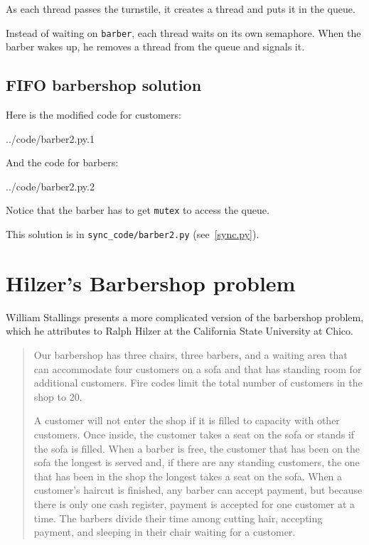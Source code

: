 \documentclass{book}
\begin{document}


As each thread passes the turnstile, it creates a thread and puts it
in the queue.

Instead of waiting on {\tt barber}, each thread waits on its own
semaphore.  When the barber wakes up, he removes a thread from the queue and
signals it.



\subsection{FIFO barbershop solution}

Here is the modified code for customers:


{../code/barber2.py.1}

And the code for barbers:


{../code/barber2.py.2}

Notice that the barber has to get {\tt mutex} to access the
queue.

This solution is in \verb"sync_code/barber2.py" (see~\ref{sync.py}).



\section {Hilzer's Barbershop problem}

William Stallings \cite{stallings} presents a more complicated version
of the barbershop problem, which he attributes to Ralph Hilzer at the
California State University at Chico.

\begin{quotation}
    Our barbershop has three chairs, three barbers, and a waiting
    area that can accommodate four customers on a sofa and that has
    standing room for additional customers.  Fire codes limit the
    total number of customers in the shop to 20.

    A customer will not enter the shop if it is filled to capacity with
    other customers.  Once inside, the customer takes a seat on the sofa
    or stands if the sofa is filled.  When a barber is free, the customer
    that has been on the sofa the longest is served and, if there are any
    standing customers, the one that has been in the shop the longest
    takes a seat on the sofa.  When a customer's haircut is finished, any
    barber can accept payment, but because there is only one cash
    register, payment is accepted for one customer at a time.  The barbers
    divide their time among cutting hair, accepting payment, and sleeping
    in their chair waiting for a customer.
\end{quotation}
\end{document}
